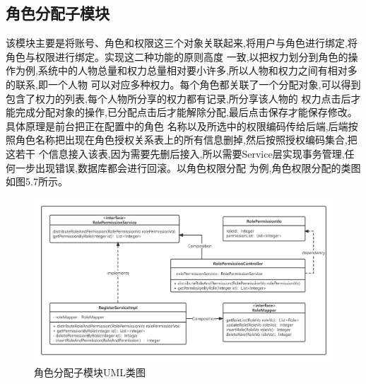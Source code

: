 \subsection{角色分配子模块}


该模块主要是将账号、角色和权限这三个对象关联起来,将用户与角色进行绑定,将角色与权限进行绑定。实现这二种功能的原则高度
一致,以把权力划分到角色的操作为例,系统中的人物总量和权力总量相对要小许多,所以人物和权力之间有相对多的联系,即一个人物
可以对应多种权力。每个角色都关联了一个分配对象,可以得到包含了权力的列表,每个人物所分享的权力都有记录,所分享该人物的
权力点击后才能完成分配对象的操作,已分配点击后才能解除分配,最后点击保存才能保存修改。具体原理是前台把正在配置中的角色
名称以及所选中的权限编码传给后端,后端按照角色名称把出现在角色授权关系表上的所有信息删掉,然后按照授权编码集合,把这若干
个信息接入该表,因为需要先删后接入,所以需要Service层实现事务管理,任何一步出现错误,数据库都会进行回滚。以角色权限分配
为例,角色权限分配的类图如图5.7所示。

\begin{figure}[htb]
    \centering
    \includegraphics[width=1\textwidth]{my_figures/chapter5/角色分配子模块UML类图.png}
    \caption{角色分配子模块UML类图}
    \label{fig:角色分配子模块UML类图}
\end{figure}

